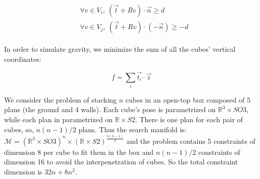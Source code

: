 \begin{align}
  \begin{split}
    &\forall v\in V_i,\ (\vec{t} + R v)\cdot \vec{n} \geq d \\
    &\forall v\in V_j,\ (\vec{t} + R v)\cdot \left(-\vec{n}\right) \geq -d
  \end{split}
\end{align}

In order to simulate gravity, we minimize the sum of all the cubes' vertical coordinates:

\begin{equation}
  f = \sum\limits_i \vec{t_i}\cdot \vec{z}
\end{equation}

We consider the problem of stacking $n$ cubes in an open-top box composed of 5 plans (the ground and 4 walls).
Each cube's pose is parametrized on $\mathbb{R}^3\times SO3$, while each plan in parametrized on $\mathbb{R}\times S2$.
There is one plan for each pair of cubes, so, $n(n-1)/2$ plans.
Thus the search manifold is: $\mathcal{M} = \left( \mathbb{R}^3\times SO3 \right)^n \times \left( \mathbb{R} \times S2 \right)^{\frac{n(n-1)}{2}} $ and the problem contains 5 constraints of dimension 8 per cube to fit them in the box and $n(n-1)/2$ constraints of dimension 16 to avoid the interpenetration of cubes.
So the total constraint dimension is $32n+8n^2$.
